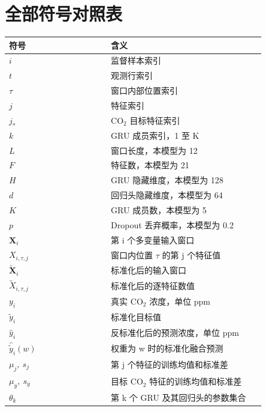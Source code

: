 \documentclass[UTF8,a4paper,11pt]{ctexart}
\begin{document}
\section{全部符号对照表}
\begin{longtable}{>{\raggedright\arraybackslash}p{0.37\linewidth}p{0.57\linewidth}}
\toprule 符号 & 含义 \\ \midrule \endhead
$i$ & 监督样本索引 \\
$t$ & 观测行索引 \\
$\tau$ & 窗口内部位置索引 \\
$j$ & 特征索引 \\
$j_*$ & CO$_2$ 目标特征索引 \\
$k$ & GRU 成员索引，1 至 K \\
$L$ & 窗口长度，本模型为 12 \\
$F$ & 特征数，本模型为 21 \\
$H$ & GRU 隐藏维度，本模型为 128 \\
$d$ & 回归头隐藏维度，本模型为 64 \\
$K$ & GRU 成员数，本模型为 5 \\
$p$ & Dropout 丢弃概率，本模型为 0.2 \\
$\mathbf{X}_i$ & 第 i 个多变量输入窗口 \\
$X_{i,\tau,j}$ & 窗口内位置 $\tau$ 的第 j 个特征值 \\
$\widetilde{\mathbf{X}}_i$ & 标准化后的输入窗口 \\
$\widetilde{X}_{i,\tau,j}$ & 标准化后的逐特征数值 \\
$y_i$ & 真实 CO$_2$ 浓度，单位 ppm \\
$\widetilde{y}_i$ & 标准化目标值 \\
$\widehat{y}_i$ & 反标准化后的预测浓度，单位 ppm \\
$\widehat{\widetilde{y}}_i(w)$ & 权重为 w 时的标准化融合预测 \\
$\mu_j,\ s_j$ & 第 j 个特征的训练均值和标准差 \\
$\mu_y,\ s_y$ & 目标 CO$_2$ 特征的训练均值和标准差 \\
$\theta_k$ & 第 k 个 GRU 及其回归头的参数集合 \\

\end{longtable}
\end{document}
